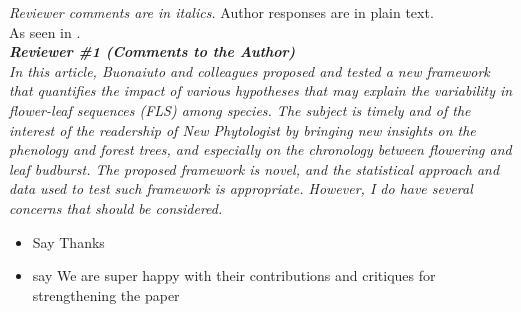 \documentclass{article}[11pt]
\begin{document}
\setlength\parindent{0pt}



\emph{Reviewer comments are in italics.} Author responses are in plain text.\\
As seen in .\\

\emph{{\bf Reviewer \#1 (Comments to the Author)}}\\

\emph{In this article, Buonaiuto and colleagues proposed and tested a new framework that quantifies the impact of various hypotheses that may explain the variability in flower-leaf sequences (FLS) among species. The subject is timely and of the interest of the readership of New Phytologist by bringing new insights on the phenology and forest trees, and especially on the chronology between flowering and leaf budburst. The proposed framework is novel, and the statistical approach and data used to test such framework is appropriate. However, I do have several concerns that should be considered.}
\begin{itemize}
\item Say Thanks
\item say We are super happy with their contributions and critiques for strengthening the paper
\end{itemize}
\end{document}
